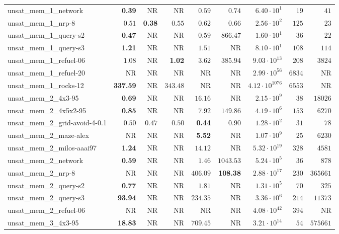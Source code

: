 \begin{tabular}{lrrrrrrrr}
unsat\_mem\_1\_network & \textbf{0.39} & NR & NR & $0.59$ & $0.74$ & $6.40\cdot 10^{1}$ & $19$ & $41$ \\
unsat\_mem\_1\_nrp-8 & $0.51$ & \textbf{0.38} & $0.55$ & $0.62$ & $0.66$ & $2.56\cdot 10^{2}$ & $125$ & $23$ \\
unsat\_mem\_1\_query-s2 & \textbf{0.47} & NR & NR & $0.59$ & $866.47$ & $1.60\cdot 10^{1}$ & $36$ & $22$ \\
unsat\_mem\_1\_query-s3 & \textbf{1.21} & NR & NR & $1.51$ & NR & $8.10\cdot 10^{1}$ & $108$ & $114$ \\
unsat\_mem\_1\_refuel-06 & $1.08$ & NR & \textbf{1.02} & $3.62$ & $385.94$ & $9.03\cdot 10^{13}$ & $208$ & $3824$ \\
unsat\_mem\_1\_refuel-20 & NR & NR & NR & NR & NR & $2.99\cdot 10^{56}$ & $6834$ & NR \\
unsat\_mem\_1\_rocks-12 & \textbf{337.59} & NR & $343.48$ & NR & NR & $4.12\cdot 10^{1076}$ & $6553$ & NR \\
unsat\_mem\_2\_4x3-95 & \textbf{0.69} & NR & NR & $16.16$ & NR & $2.15\cdot 10^{9}$ & $38$ & $18026$ \\
unsat\_mem\_2\_4x5x2-95 & \textbf{0.85} & NR & NR & $7.92$ & $149.86$ & $4.19\cdot 10^{6}$ & $153$ & $6270$ \\
unsat\_mem\_2\_grid-avoid-4-0.1 & $0.50$ & $0.47$ & $0.50$ & \textbf{0.44} & $0.90$ & $1.28\cdot 10^{2}$ & $31$ & $78$ \\
unsat\_mem\_2\_maze-alex & NR & NR & NR & \textbf{5.52} & NR & $1.07\cdot 10^{9}$ & $25$ & $6230$ \\
unsat\_mem\_2\_milos-aaai97 & \textbf{1.24} & NR & NR & $14.12$ & NR & $5.32\cdot 10^{19}$ & $328$ & $4581$ \\
unsat\_mem\_2\_network & \textbf{0.59} & NR & NR & $1.46$ & $1043.53$ & $5.24\cdot 10^{5}$ & $36$ & $878$ \\
unsat\_mem\_2\_nrp-8 & NR & NR & NR & $406.09$ & \textbf{108.38} & $2.88\cdot 10^{17}$ & $230$ & $365661$ \\
unsat\_mem\_2\_query-s2 & \textbf{0.77} & NR & NR & $1.81$ & NR & $1.31\cdot 10^{5}$ & $70$ & $325$ \\
unsat\_mem\_2\_query-s3 & \textbf{93.94} & NR & NR & $234.35$ & NR & $3.36\cdot 10^{6}$ & $214$ & $11373$ \\
unsat\_mem\_2\_refuel-06 & NR & NR & NR & NR & NR & $4.08\cdot 10^{42}$ & $394$ & NR \\
unsat\_mem\_3\_4x3-95 & \textbf{18.83} & NR & NR & $709.45$ & NR & $3.21\cdot 10^{14}$ & $54$ & $575661$ \\

\end{tabular}

